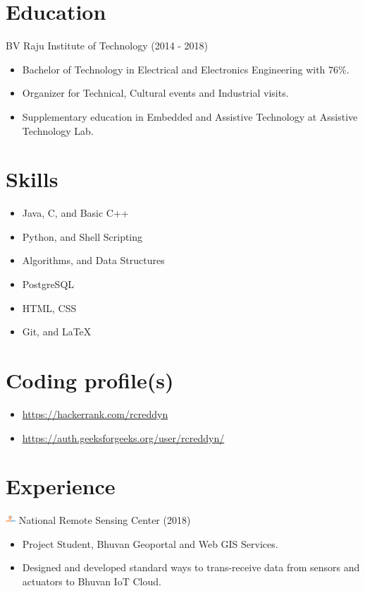 \documentclass{article}
\begin{document}
\begin{multicols}{2}
\section*{Education}
 BV Raju Institute of Technology (2014 - 2018)
\begin{itemize}
\item \small Bachelor of Technology in Electrical and Electronics Engineering with 76\%.
\item \small Organizer for Technical, Cultural events and Industrial visits.
\item \small Supplementary education in Embedded and Assistive Technology  at Assistive Technology Lab.
\end{itemize}

\section*{Skills}
\begin{itemize}
    \item Java, C, and Basic C++
    \item  Python, and Shell Scripting
    \item Algorithms, and Data Structures
    \item PostgreSQL
    \item HTML, CSS
    \item Git, and \LaTeX
\end{itemize}

\section*{Coding profile(s)}
\begin{itemize}
\item \url {https://hackerrank.com/rcreddyn}
\item \url {https://auth.geeksforgeeks.org/user/rcreddyn/}
\end{itemize}

\section*{Experience}
\includegraphics[width=14px]{isro.png} National Remote Sensing Center (2018)
\begin{itemize}
\item \small Project Student, Bhuvan Geoportal and Web GIS Services.
\item \small Designed and developed standard ways to trans-receive data from sensors and actuators to  Bhuvan IoT Cloud.
\end{itemize}


\end{multicols}
\end{document}
